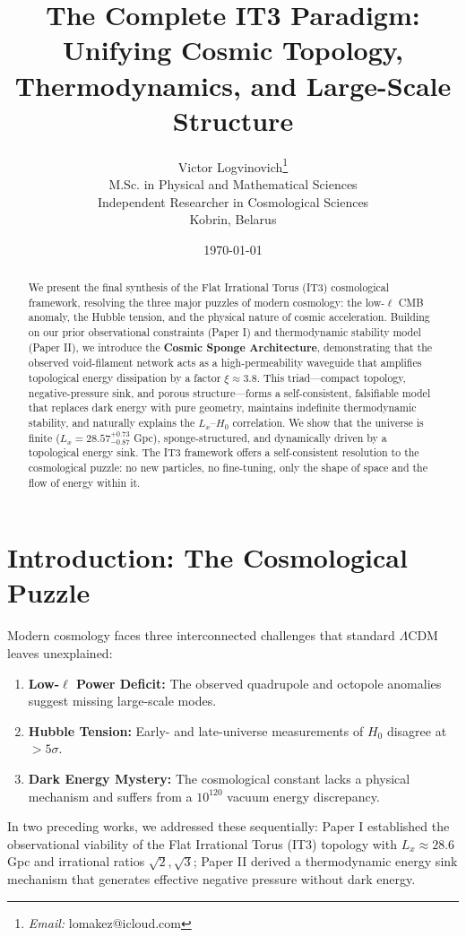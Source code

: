\documentclass[12pt,a4paper]{article}
\title{\textbf{The Complete IT3 Paradigm: Unifying Cosmic Topology, Thermodynamics, and Large-Scale Structure}}
\author{Victor Logvinovich\thanks{\textit{Email:} lomakez@icloud.com}\\
M.Sc. in Physical and Mathematical Sciences\\
Independent Researcher in Cosmological Sciences\\
Kobrin, Belarus}
\date{\today}
\begin{document}
\maketitle

\begin{abstract}
We present the final synthesis of the Flat Irrational Torus (IT3) cosmological framework, resolving the three major puzzles of modern cosmology: the low-$\ell$ CMB anomaly, the Hubble tension, and the physical nature of cosmic acceleration. Building on our prior observational constraints (Paper I) and thermodynamic stability model (Paper II), we introduce the \textbf{Cosmic Sponge Architecture}, demonstrating that the observed void-filament network acts as a high-permeability waveguide that amplifies topological energy dissipation by a factor $\xi \approx 3.8$. This triad---compact topology, negative-pressure sink, and porous structure---forms a self-consistent, falsifiable model that replaces dark energy with pure geometry, maintains indefinite thermodynamic stability, and naturally explains the $L_x$--$H_0$ correlation. We show that the universe is finite ($L_x = 28.57^{+0.73}_{-0.87}$ Gpc), sponge-structured, and dynamically driven by a topological energy sink. The IT3 framework offers a self-consistent resolution to the cosmological puzzle: no new particles, no fine-tuning, only the shape of space and the flow of energy within it.
\end{abstract}

\section{Introduction: The Cosmological Puzzle}

Modern cosmology faces three interconnected challenges that standard $\Lambda$CDM leaves unexplained:
\begin{enumerate}
    \item \textbf{Low-$\ell$ Power Deficit:} The observed quadrupole and octopole anomalies suggest missing large-scale modes.
    \item \textbf{Hubble Tension:} Early- and late-universe measurements of $H_0$ disagree at $>5\sigma$.
    \item \textbf{Dark Energy Mystery:} The cosmological constant lacks a physical mechanism and suffers from a $10^{120}$ vacuum energy discrepancy.
\end{enumerate}
In two preceding works, we addressed these sequentially: Paper I established the observational viability of the Flat Irrational Torus (IT3) topology with $L_x \approx 28.6$ Gpc and irrational ratios $\sqrt{2}, \sqrt{3}$; Paper II derived a thermodynamic energy sink mechanism that generates effective negative pressure without dark energy. 
\end{document}
